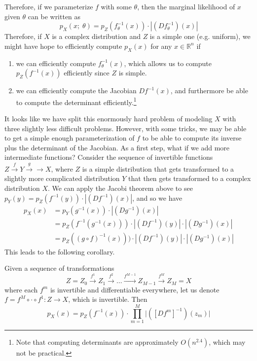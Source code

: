 \documentclass{article}
\begin{document}
  Therefore, if we parameterize $f$ with some $\theta$, then the marginal likelihood of $x$ given $\theta$ can be written as 
  \begin{equation}
    p_X (x;\; \theta) = p_Z (f^{-1}_\theta (x)) \cdot | (D f^{-1}_\theta) (x) |
  \end{equation} 
  Therefore, if $X$ is a complex distribution and $Z$ is a simple one (e.g. uniform), we might have hope to efficiently compute $p_X (x)$ for any $x \in \mathbb{R}^n$ if 
  \begin{enumerate}
    \item we can efficiently compute $f^{-1}_\theta (x)$, which allows us to compute $p_Z (f^{-1} (x))$ efficiently since $Z$ is simple. 
    \item we can efficiently compute the Jacobian $Df^{-1} (x)$, and furthermore be able to compute the determinant efficiently.\footnote{Note that computing determinants are approximately $O(n^{2.4})$, which may not be practical. } 
  \end{enumerate} 
  It looks like we have split this enormously hard problem of modeling $X$ with three slightly less difficult problems. However, with some tricks, we may be able to get a simple enough parameterization of $f$ to be able to compute its inverse plus the determinant of the Jacobian. As a first step, what if we add more intermediate functions? Consider the sequence of invertible functions $Z \xrightarrow{f} Y \xrightarrow{g} \rightarrow X$, where $Z$ is a simple distribution that gets transformed to a slightly more complicated distribution $Y$ that then gets transformed to a complex distribution $X$. We can apply the Jacobi theorem above to see $p_Y (y) = p_Z (f^{-1} (y)) \cdot | (Df^{-1})(x)|$, and so we have 
  \begin{align}
    p_X (x) & = p_Y (g^{-1} (x)) \cdot | (D g^{-1}) (x) | \\
            & = p_Z (f^{-1} (g^{-1} (x))) \cdot | (Df^{-1}) (y)| \cdot | (D g^{-1}) (x) | \\ 
            & = p_Z ((g \circ f)^{-1} (x))) \cdot | (Df^{-1}) (y)| \cdot | (D g^{-1}) (x) | 
  \end{align}
  This leads to the following corollary. 

  \begin{corollary}[Jacobi]
    Given a sequence of transformations 
    \begin{equation}
      Z = Z_0 \xrightarrow{f^1} Z_1 \xrightarrow{f^2} \ldots \xrightarrow{f^{M-1}} Z_{M-1} \xrightarrow{f^M} Z_M = X
    \end{equation} 
    where each $f^m$ is invertible and differentiable everywhere, let us denote $f = f^M \circ \cdot \circ f^1: Z \rightarrow X$, which is invertible. Then
    \begin{equation}
      p_X (x) = p_Z (f^{-1} (x)) \cdot \prod_{m=1}^M \big|([D f^m]^{-1})(z_m) \big|
    \end{equation}
  \end{corollary} 
\end{document}
